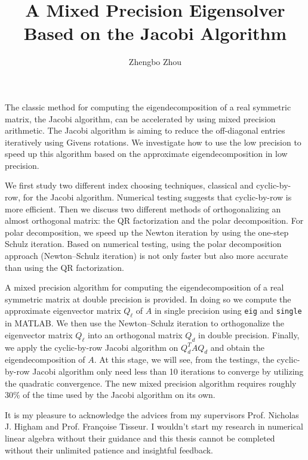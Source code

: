 \documentclass[12pt,a4paper, MSc,twoside]{muthesis_2020}
\begin{document}
\title{A Mixed Precision Eigensolver Based on the Jacobi Algorithm}
\author{Zhengbo Zhou}
\def\wordcount{12597}

\tablespagefalse

\beforeabstract

The classic method for computing the eigendecomposition of a real symmetric matrix, the Jacobi algorithm, can be accelerated by using mixed precision arithmetic. The Jacobi algorithm is aiming to reduce the off-diagonal entries iteratively using Givens rotations. We investigate how to use the low precision to speed up this algorithm based on the approximate eigendecomposition in low precision. 

We first study two different index choosing techniques, classical and cyclic-by-row, for the Jacobi algorithm. Numerical testing suggests that cyclic-by-row is more efficient. Then we discuss two different methods of orthogonalizing an almost orthogonal matrix: the QR factorization and the polar decomposition. For polar decomposition, we speed up the Newton iteration by using the one-step Schulz iteration. Based on numerical testing, using the polar decomposition approach (Newton--Schulz iteration) is not only faster but also more accurate than using the QR factorization. 

A mixed precision algorithm for computing the eigendecomposition of a real symmetric matrix at double precision is provided. In doing so we compute the approximate eigenvector matrix $Q_\ell$ of $A$ in single precision using \texttt{eig} and \texttt{single} in MATLAB. We then use the Newton--Schulz iteration to orthogonalize the eigenvector matrix $Q_\ell$ into an orthogonal matrix $Q_d$ in double precision. Finally, we apply the cyclic-by-row Jacobi algorithm on $Q_d^TAQ_d$ and obtain the eigendecomposition of $A$. At this stage, we will see, from the testings, the cyclic-by-row Jacobi algorithm only need less than 10 iterations to converge by utilizing the quadratic convergence. The new mixed precision algorithm requires roughly 30\% of the time used by the Jacobi algorithm on its own.



\afterabstract

It is my pleasure to acknowledge the advices from my supervisors Prof. Nicholas J. Higham and Prof. Fran\c coise Tisseur. I wouldn't start my research in numerical linear algebra without their guidance and this thesis cannot be completed without their unlimited patience and insightful feedback.
\end{document}
